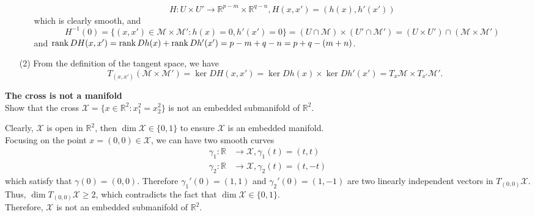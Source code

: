 \documentclass[en, oneside]{assignment}
\begin{document}
\begin{sol}
\begin{itemize}
\begin{itemize}
\begin{equation*}
                H: U \times U' \to \mathbb{R}^{p-m} \times \mathbb{R}^{q-n}, H(x, x') = (h(x), h'(x'))
            \end{equation*}
            which is clearly smooth, and
            \begin{equation*}
                H^{-1}(0) = \{(x, x') \in \mathcal{M} \times \mathcal{M}': h(x) = 0, h'(x') = 0\} = (U \cap \mathcal{M}) \times (U' \cap \mathcal{M}') = (U \times U') \cap (\mathcal{M} \times \mathcal{M}')
            \end{equation*}
            and $\operatorname{rank}{DH(x, x')} = \operatorname{rank}{Dh(x)} + \operatorname{rank}{Dh'(x')} = p-m + q-n = p + q - (m + n)$.
        \end{itemize}
        \item[(2)] From the definition of the tangent space, we have
        \begin{equation*}
            T_{(x, x')}\left(\mathcal{M} \times \mathcal{M}'\right) = \ker{DH(x, x')} = \ker{Dh(x)} \times \ker{Dh'(x')} = T_x\mathcal{M} \times T_{x'}\mathcal{M}'.
        \end{equation*}
    \end{itemize}
\end{sol}

\begin{prob} \textbf{The cross is not a manifold}\\
    Show that the cross $\mathcal{X} = \{x \in \mathbb{R}^2: x_1^2 = x_2^2 \}$ is not an embedded submanifold of $\mathbb{R}^2$.
\end{prob}

\begin{sol}
    Clearly, $\mathcal{X}$ is open in $\mathbb{R}^2$, then $\dim{\mathcal{X}} \in \{0, 1\}$ to ensure $\mathcal{X}$ is an embedded manifold.\\
    Focusing on the point $x = (0, 0) \in \mathcal{X}$, we can have two smooth curves
    \begin{align*}
        \gamma_1: \mathbb{R} & \to \mathcal{X}, \gamma_1(t) = (t, t)\\
        \gamma_2: \mathbb{R} & \to \mathcal{X}, \gamma_2(t) = (t, -t)
    \end{align*}
    which satisfy that $\gamma(0) = (0, 0)$. Therefore $\gamma_1'(0) = (1, 1)$ 
    and $\gamma_2'(0) = (1, -1)$ are two linearly independent vectors in $T_{(0, 0)}\mathcal{X}$.\\
    Thus, $\dim{T_{(0, 0)}\mathcal{X}} \geq 2$, which contradicts the fact that $\dim{\mathcal{X}} \in \{0, 1\}$.\\
    Therefore, $\mathcal{X}$ is not an embedded submanifold of $\mathbb{R}^2$.
\end{sol}
\end{document}
